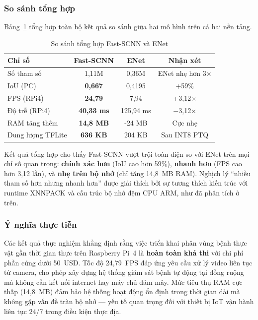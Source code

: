 \documentclass[conference]{IEEEtran}
\begin{document}
\subsubsection{So sánh tổng hợp}

Bảng~\ref{tab:overall} tổng hợp toàn bộ kết quả so sánh giữa hai mô hình trên cả hai nền tảng.

\begin{table}[htbp]
\centering
\caption{So sánh tổng hợp Fast-SCNN và ENet}
\label{tab:overall}
\begin{tabular}{lccc}
\toprule
\textbf{Chỉ số} & \textbf{Fast-SCNN} & \textbf{ENet} & \textbf{Nhận xét} \\
\midrule
Số tham số              & 1,11M              & 0,36M & ENet nhẹ hơn 3$\times$ \\
IoU (PC)      & \textbf{0,667}     & 0,4195 & +59\% \\
FPS (RPi4)    & \textbf{24,79}     & 7,94 & +3,12$\times$ \\
Độ trễ (RPi4) & \textbf{40,33 ms}  & 125,94 ms & $-$3,12$\times$ \\
RAM tăng thêm           & \textbf{14,8 MB}   & -24 MB & Cực nhẹ \\
Dung lượng TFLite       & \textbf{636 KB}    & 204 KB & Sau INT8 PTQ \\
\bottomrule
\end{tabular}
\end{table}

Kết quả tổng hợp cho thấy Fast-SCNN vượt trội toàn diện so với ENet trên mọi chỉ số quan trọng: \textbf{chính xác hơn} (IoU cao hơn 59\%), \textbf{nhanh hơn} (FPS cao hơn 3,12 lần), và \textbf{nhẹ trên bộ nhớ} (chỉ tăng 14,8~MB RAM). Nghịch lý ``nhiều tham số hơn nhưng nhanh hơn'' được giải thích bởi sự tương thích kiến trúc với runtime XNNPACK và cấu trúc bộ nhớ đệm CPU ARM, như đã phân tích ở trên.

\subsubsection{Ý nghĩa thực tiễn}

Các kết quả thực nghiệm khẳng định rằng việc triển khai phân vùng bệnh thực vật gần thời gian thực trên Raspberry Pi~4 là \textbf{hoàn toàn khả thi} với chi phí phần cứng dưới 50~USD. Tốc độ 24,79~FPS đáp ứng yêu cầu xử lý video liên tục từ camera, cho phép xây dựng hệ thống giám sát bệnh tự động tại đồng ruộng mà không cần kết nối internet hay máy chủ đám mây. Mức tiêu thụ RAM cực thấp (14,8~MB) đảm bảo hệ thống hoạt động ổn định trong thời gian dài mà không gặp vấn đề tràn bộ nhớ --- yếu tố quan trọng đối với thiết bị IoT vận hành liên tục 24/7 trong điều kiện thực địa.
\end{document}

